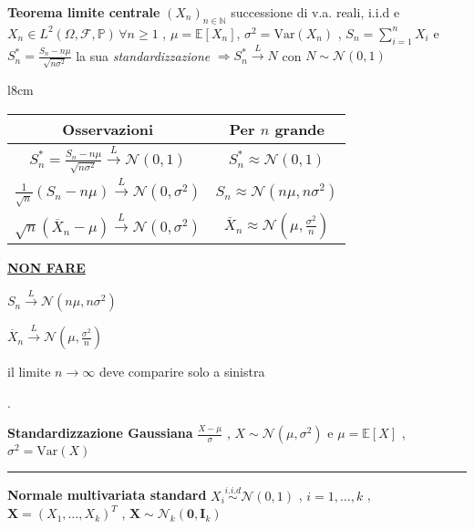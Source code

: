 \documentclass[openany]{book} %
\begin{document}
\textbf{Teorema limite centrale} $(X_n)_{n\in \mathbb{N}}$ successione di v.a. reali, i.i.d e $X_n\in L^2(\Omega,\mathcal{F},\mathbb{P})\,\forall n\geq 1$ , $\mu=\mathbb{E}[X_n]$, $\sigma^2=\text{Var}(X_n)$ , $S_n=\sum_{i=1}^nX_i$ e $S_n^*=\frac{S_n-n\mu}{\sqrt{n\sigma^2}}$ la sua \textit{standardizzazione} $\Rightarrow S_n^*\overset{L}{\rightarrow}N$ con $N\sim \mathcal{N}(0,1)$

\begin {wraptable}{l}{8cm}

\begin{tabular}{c|c}

\textbf{Osservazioni} & Per $n$ grande \\

\hline

$S_n^*=\frac{S_n-n\mu}{\sqrt{n\sigma^2}}\overset{L}{\rightarrow}\mathcal{N}(0,1)$ & $S_n^*\approx \mathcal{N}(0,1)$ \\

$\frac{1}{\sqrt{n}}(S_n-n\mu)\overset{L}{\rightarrow}\mathcal{N}(0,\sigma^2)$ & $S_n\approx \mathcal{N}(n\mu,n\sigma^2)$ \\

$\sqrt{n}(\overline X_n-\mu)\overset{L}{\rightarrow}\mathcal{N}(0,\sigma^2)$ & $\overline X_n\approx \mathcal{N}(\mu,\frac{\sigma^2}{n})$ \\

\end{tabular}

\end {wraptable}

\hfill

\hfill

\underline{\textbf{NON FARE}}

$S_n\overset{L}{\rightarrow}\mathcal{N}(n\mu,n\sigma^2)$

$\overline X_n \overset{L}{\rightarrow}\mathcal{N}(\mu,\frac{\sigma^2}{n})$

il limite $n \rightarrow \infty$ deve comparire solo a sinistra

.

\textbf{Standardizzazione Gaussiana} $\frac{X-\mu}{\sigma}$ , \quad$X\sim\mathcal{N}(\mu,\sigma^2)$ e $\mu = \mathbb{E}[X]$ , $\sigma^2=\text{Var}(X)$

\rule{\textwidth}{0.4pt}

\textbf{Normale multivariata standard} $X_i \overset{i.i.d}{\sim}\mathcal{N}(0,1)$ , $i=1,\dots,k$ , $\boldsymbol{X}=(X_1,\dots,X_k)^T$ , $\boldsymbol{X}\sim \mathcal{N}_k(\boldsymbol{0},\boldsymbol{I}_k)$
\end{document}
